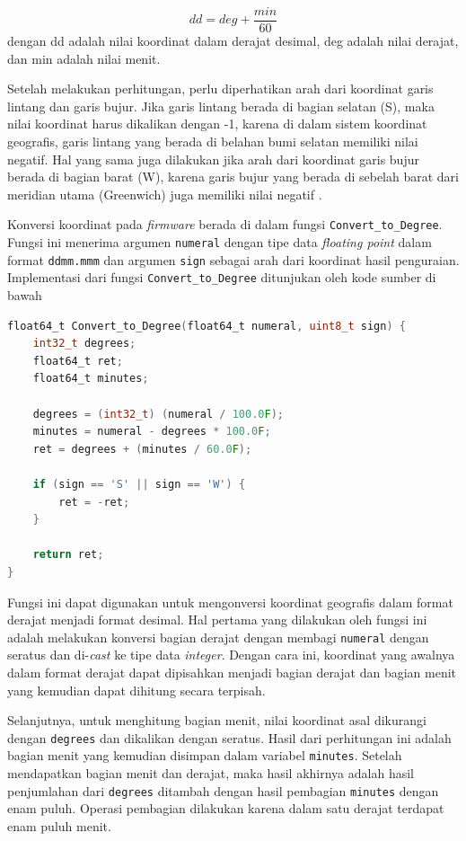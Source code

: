 \begin{equation}
	dd = deg + \frac{min}{60} 
\end{equation}
dengan dd adalah nilai koordinat dalam derajat desimal, deg adalah nilai derajat, dan min adalah nilai menit.

Setelah melakukan perhitungan, perlu diperhatikan arah dari koordinat garis lintang dan garis bujur. Jika garis lintang berada di bagian selatan (S), maka nilai koordinat harus dikalikan dengan -1, karena di dalam sistem koordinat geografis, garis lintang yang berada di belahan bumi selatan memiliki nilai negatif. Hal yang sama juga dilakukan jika arah dari koordinat garis bujur berada di bagian barat (W), karena garis bujur yang berada di sebelah barat dari meridian utama (Greenwich) juga memiliki nilai negatif \cite{AlHindawi2012}.

Konversi koordinat pada \textit{firmware} berada di dalam fungsi \texttt{Convert\_to\_Degree}. Fungsi ini menerima argumen \texttt{numeral} dengan tipe data \textit{floating point} dalam format \texttt{ddmm.mmm} dan argumen \texttt{sign} sebagai arah dari koordinat hasil penguraian. Implementasi dari fungsi \texttt{Convert\_to\_Degree} ditunjukan oleh kode sumber di bawah
\begin{lstlisting}[language=c]
float64_t Convert_to_Degree(float64_t numeral, uint8_t sign) {
	int32_t degrees;
	float64_t ret;
	float64_t minutes;
	
	degrees = (int32_t) (numeral / 100.0F);
	minutes = numeral - degrees * 100.0F;
	ret = degrees + (minutes / 60.0F);
	
	if (sign == 'S' || sign == 'W') {
		ret = -ret;
	}
	
	return ret;
}
\end{lstlisting}

Fungsi ini dapat digunakan untuk mengonversi koordinat geografis dalam format derajat menjadi format desimal. Hal pertama yang dilakukan oleh fungsi ini adalah melakukan konversi bagian derajat dengan membagi \texttt{numeral} dengan seratus dan di-\textit{cast} ke tipe data \textit{integer}. Dengan cara ini, koordinat yang awalnya dalam format derajat dapat dipisahkan menjadi bagian derajat dan bagian menit yang kemudian dapat dihitung secara terpisah.

Selanjutnya, untuk menghitung bagian menit, nilai koordinat asal dikurangi dengan \texttt{degrees} dan dikalikan dengan seratus. Hasil dari perhitungan ini adalah bagian menit yang kemudian disimpan dalam variabel \texttt{minutes}. Setelah mendapatkan bagian menit dan derajat, maka hasil akhirnya adalah hasil penjumlahan dari \texttt{degrees} ditambah dengan hasil pembagian \texttt{minutes} dengan enam puluh. Operasi pembagian dilakukan karena dalam satu derajat terdapat enam puluh menit.

